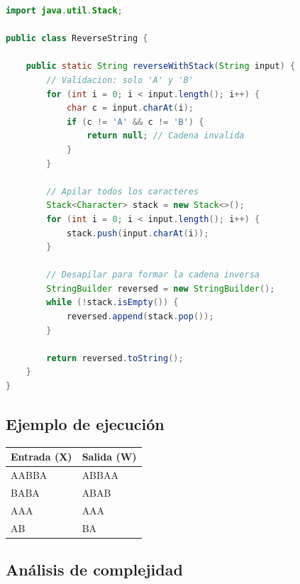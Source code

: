 \documentclass[12pt]{article}
\begin{document}
\begin{lstlisting}[style=estilo_base, language=Java]
import java.util.Stack;

public class ReverseString {
    
    public static String reverseWithStack(String input) {
        // Validacion: solo 'A' y 'B'
        for (int i = 0; i < input.length(); i++) {
            char c = input.charAt(i);
            if (c != 'A' && c != 'B') {
                return null; // Cadena invalida
            }
        }
        
        // Apilar todos los caracteres
        Stack<Character> stack = new Stack<>();
        for (int i = 0; i < input.length(); i++) {
            stack.push(input.charAt(i));
        }
        
        // Desapilar para formar la cadena inversa
        StringBuilder reversed = new StringBuilder();
        while (!stack.isEmpty()) {
            reversed.append(stack.pop());
        }
        
        return reversed.toString();
    }
}
\end{lstlisting}

\subsection*{Ejemplo de ejecución}

\begin{center}
\begin{tabular}{ll}
\toprule
\textbf{Entrada (X)} & \textbf{Salida (W)} \\
\midrule
AABBA & ABBAA \\
BABA  & ABAB \\
AAA   & AAA \\
AB    & BA \\
\bottomrule
\end{tabular}
\end{center}

\newpage
\subsection*{Análisis de complejidad}
\end{document}
